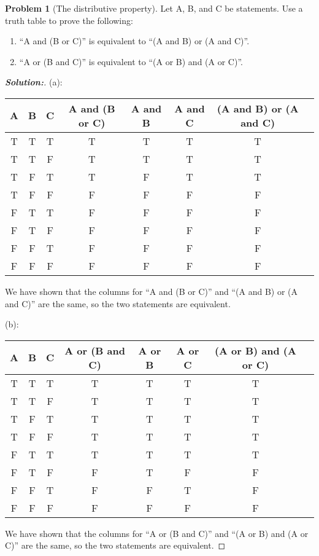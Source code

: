 \documentclass[12pt]{article}
\theoremstyle{definition}\newtheorem{problem}{Problem}
\newenvironment{solution}{\begin{proof}[\bfseries\textup{Solution:}]}{\end{proof}}
\begin{document}
%
\newpage
\begin{problem}[The distributive property]
Let A, B, and C be statements.  Use a truth table to prove the following:
\begin{enumerate}
\item ``A and (B or C)'' is equivalent to ``(A and B) or (A and C)''.
\item ``A or (B and C)'' is equivalent to ``(A or B) and (A or C)''.
\end{enumerate}
\end{problem}
\begin{solution}
\quad \newline
    
    (a): \begin{center}
    \begin{tabular}{ c|c|c|c|c|c|c|c}
    A & B & C & A and (B or C) & A and B & A and C & (A and B) or (A and C)\\
    \hline
    T & T & T & T & T & T & T\\
    T & T & F & T & T & T & T\\
    T & F & T & T & F & T & T\\
    T & F & F & F & F & F & F\\
    F & T & T & F & F & F & F\\
    F & T & F & F & F & F & F\\
    F & F & T & F & F & F & F\\
    F & F & F & F & F & F & F\\
    \end{tabular}
\end{center}
We have shown that the columns for ``A and (B or C)'' and ``(A and B) or (A and C)'' are the same, so the two statements are equivalent.\newline

(b):

\begin{center}

\begin{tabular}{ c|c|c|c|c|c|c|c}
A & B & C & A or (B and C) & A or B & A or C & (A or B) and (A or C)\\
\hline
T & T & T & T & T & T & T\\
T & T & F & T & T & T & T\\
T & F & T & T & T & T & T\\
T & F & F & T & T & T & T\\
F & T & T & T & T & T & T\\
F & T & F & F & T & F & F\\
F & F & T & F & F & T & F\\
F & F & F & F & F & F & F\\
\end{tabular}

\end{center}

We have shown that the columns for ``A or (B and C)'' and ``(A or B) and (A or C)'' are the same, so the two statements are equivalent.

\end{solution}
\end{document}
